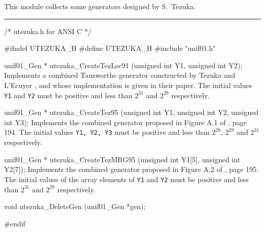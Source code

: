 
This module collects some generators designed by S.~Tezuka.

\bigskip
\hrule
\code
\hide
/* utezuka.h for ANSI C */

#ifndef UTEZUKA_H
#define UTEZUKA_H
\endhide
#include "unif01.h"


unif01_Gen * utezuka_CreateTezLec91 (unsigned int Y1, unsigned int Y2);
\endcode
  \tab  Implements a combined Tausworthe generator constructed
   by Tezuka and L'Ecuyer \cite{rTEZ91b}, and whose implementation
   is given in their paper.
%
   The initial values {\tt Y1} and {\tt Y2} must be positive and
   less than $2^{31}$ and $2^{29}$ respectively.
  \endtab
\code


unif01_Gen * utezuka_CreateTez95 (unsigned int Y1, unsigned int Y2,
                                  unsigned int Y3);
\endcode
  \tab  Implements the  combined  generator proposed in
   Figure A.1 of \cite{rTEZ95a}, page 194.
   The initial values {\tt Y1, Y2, Y3} must be positive and
   less than $2^{28}$, $2^{29}$ and $2^{31}$
   respectively.
  \endtab
\code


unif01_Gen * utezuka_CreateTezMRG95 (unsigned int Y1[5],
                                     unsigned int Y2[7]);
\endcode
  \tab  Implements the  combined  generator proposed in
   Figure A.2 of \cite{rTEZ95a}, page 195.
   The initial values of the array elements of {\tt Y1} and {\tt Y2}
   must be positive and
   less than $2^{31}$ and $2^{29}$ respectively.
  \endtab




\code

void utezuka_DeleteGen (unif01_Gen *gen);
\endcode
 \tab \DelGen
 \endtab
\code

\hide
#endif
\endhide
\endcode

